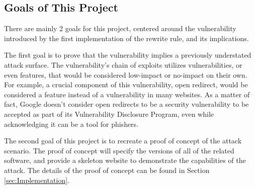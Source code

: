\documentclass[conference]{IEEEtran}
\begin{document}
\subsection{Goals of This Project}
There are mainly 2 goals for this project, centered around the vulnerability introduced by the first implementation of the rewrite rule, and its implications.

The first goal is to prove that the vulnerability implies a previously understated attack surface. The vulnerability's chain of exploits utilizes vulnerabilities, or even features, that would be considered low-impact or no-impact on their own. For example, a crucial component of this vulnerability, open redirect, would be considered a feature instead of a vulnerability in many websites. As a matter of fact, Google doesn't consider open redirects to be a security vulnerability to be accepted as part of its Vulnerability Disclosure Program, even while acknowledging it can be a tool for phishers.\cite{noauthor_open_nodate}

The second goal of this project is to recreate a proof of concept of the attack scenario. The proof of concept will specify the versions of all of the related software, and provide a skeleton website to demonstrate the capabilities of the attack. The details of the proof of concept can be found in Section \ref{sec:Implementation}.
\end{document}
